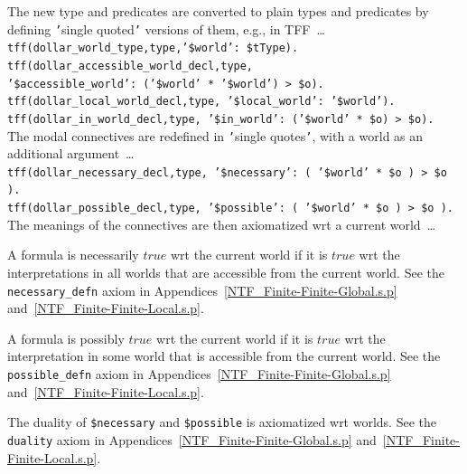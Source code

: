 \documentclass{easychair}
\newcommand{\smalltt}[1]{\small \texttt{#1}}
\newenvironment{packed_itemize}{
\vspace*{-0.3em}
\begin{itemize}
\setlength{\partopsep}{0pt}
\setlength{\itemsep}{1pt}
\setlength{\parskip}{0pt}
\setlength{\parsep}{0pt}
}{\end{itemize}}
\begin{document}
The new type and predicates are converted to plain types and predicates by defining {\tt '}single 
quoted{\tt '} versions of them, e.g., in TFF~\ldots \\
\hspace*{0.5cm}\smalltt{tff(dollar\_world\_type,type,'\$world': \$tType).} \\
\hspace*{0.5cm}\smalltt{tff(dollar\_accessible\_world\_decl,type,} \\
\hspace*{0.8cm}\smalltt{'\$accessible\_world': ('\$world' * '\$world') > \$o).} \\
\hspace*{0.5cm}\smalltt{tff(dollar\_local\_world\_decl,type, '\$local\_world': '\$world').} \\
\hspace*{0.5cm}\smalltt{tff(dollar\_in\_world\_decl,type, '\$in\_world': ('\$world' * \$o) > \$o).} \\
The modal connectives are redefined in {\tt '}single quotes{\tt '}, with a world as an additional
argument~\ldots \\
\hspace*{0.5cm}\smalltt{tff(dollar\_necessary\_decl,type, '\$necessary': ( '\$world' * \$o ) > \$o ).} \\
\hspace*{0.5cm}\smalltt{tff(dollar\_possible\_decl,type, '\$possible': ( '\$world' * \$o ) > \$o ).} \\
The meanings of the connectives are then axiomatized wrt a current world~\ldots
\begin{packed_itemize}
\item A formula is necessarily $true$ wrt the current world if it is $true$ wrt the interpretations
      in all worlds that are accessible from the current world.
      See the {\tt necessary\_defn} axiom in Appendices~\ref{NTF_Finite-Finite-Global.s.p}
      and~\ref{NTF_Finite-Finite-Local.s.p}.
\item A formula is possibly $true$ wrt the current world if it is $true$ wrt the interpretation
      in some world that is accessible from the current world.
      See the {\tt possible\_defn} axiom in Appendices~\ref{NTF_Finite-Finite-Global.s.p}
      and~\ref{NTF_Finite-Finite-Local.s.p}.
\item The duality of {\tt \$necessary} and {\tt \$possible} is axiomatized wrt worlds.
      See the {\tt duality} axiom in Appendices~\ref{NTF_Finite-Finite-Global.s.p}
      and~\ref{NTF_Finite-Finite-Local.s.p}.
\end{packed_itemize}
\end{document}
